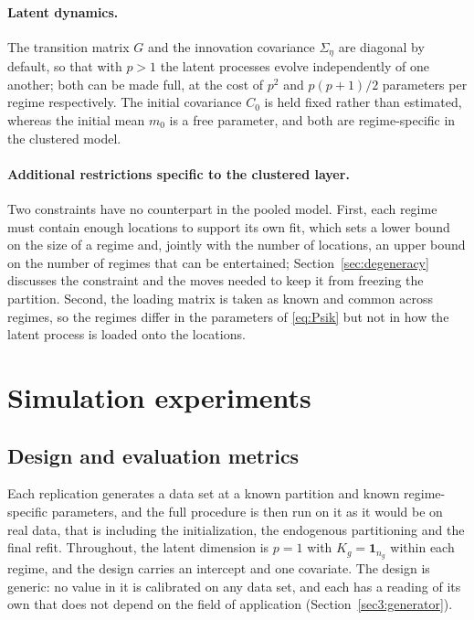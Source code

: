 \paragraph{Latent dynamics.} The transition matrix $G$ and the innovation covariance $\Sigma_\eta$ are diagonal by default, so that with $p > 1$ the latent processes evolve independently of one another; both can be made full, at the cost of $p^2$ and $p(p+1)/2$ parameters per regime respectively. The initial covariance $C_0$ is held fixed rather than estimated, whereas the initial mean $m_0$ is a free parameter, and both are regime-specific in the clustered model.

\paragraph{Additional restrictions specific to the clustered layer.} Two constraints have no counterpart in the pooled model. First, each regime must contain enough locations to support its own fit, which sets a lower bound on the size of a regime and, jointly with the number of locations, an upper bound on the number of regimes that can be entertained; Section~\ref{sec:degeneracy} discusses the constraint and the moves needed to keep it from freezing the partition. Second, the loading matrix is taken as known and common across regimes, so the regimes differ in the parameters of \eqref{eq:Psik} but not in how the latent process is loaded onto the locations.

\section{Simulation experiments}\label{sec3}

\subsection{Design and evaluation metrics}\label{sec3:design}

Each replication generates a data set at a known partition and known regime-specific parameters, and the full procedure is then run on it as it would be on real data, that is including the initialization, the endogenous partitioning and the final refit. Throughout, the latent dimension is $p=1$ with $K_g = \mathbf{1}_{n_g}$ within each regime, and the design carries an intercept and one covariate. The design is generic: no value in it is calibrated on any data set, and each has a reading of its own that does not depend on the field of application (Section~\ref{sec3:generator}).

